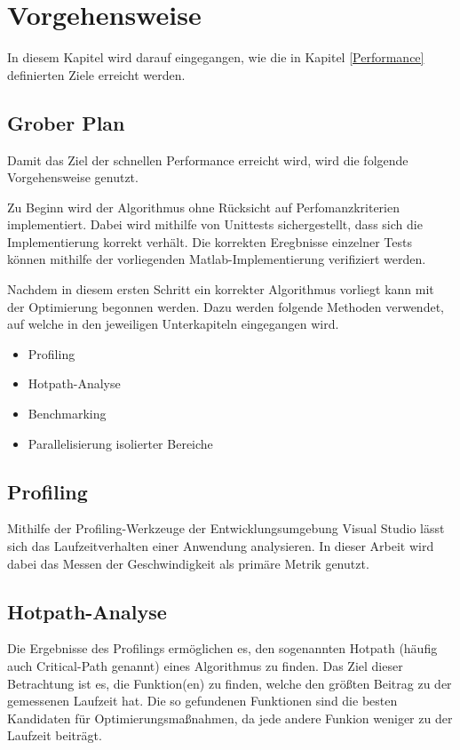 \chapter{Vorgehensweise}\label{plan}

In diesem Kapitel wird darauf eingegangen, wie die in Kapitel \ref{Performance} definierten Ziele erreicht werden.


\section{Grober Plan}

Damit das Ziel der schnellen Performance erreicht wird, wird die folgende Vorgehensweise genutzt.

Zu Beginn wird der Algorithmus ohne Rücksicht auf Perfomanzkriterien implementiert.
Dabei wird mithilfe von Unittests sichergestellt, dass sich die Implementierung korrekt verhält. 
Die korrekten Eregbnisse einzelner Tests können mithilfe der vorliegenden Matlab-Implementierung verifiziert werden.

Nachdem in diesem ersten Schritt ein korrekter Algorithmus vorliegt kann mit der Optimierung begonnen werden.
Dazu werden folgende Methoden verwendet, auf welche in den jeweiligen Unterkapiteln eingegangen wird.

\begin{itemize}
    \item Profiling
    \item Hotpath-Analyse
    \item Benchmarking
    \item Parallelisierung isolierter Bereiche
\end{itemize}

\section{Profiling}

Mithilfe der Profiling-Werkzeuge der Entwicklungsumgebung Visual Studio lässt sich das Laufzeitverhalten einer Anwendung analysieren.
In dieser Arbeit wird dabei das Messen der Geschwindigkeit als primäre Metrik genutzt. 


\section{Hotpath-Analyse}

Die Ergebnisse des Profilings ermöglichen es, den sogenannten Hotpath (häufig auch Critical-Path genannt) eines Algorithmus zu finden.
Das Ziel dieser Betrachtung ist es, die Funktion(en) zu finden, welche den größten Beitrag zu der gemessenen Laufzeit hat. 
Die so gefundenen Funktionen sind die besten Kandidaten für Optimierungsmaßnahmen, da jede andere Funkion weniger zu der Laufzeit beiträgt.


